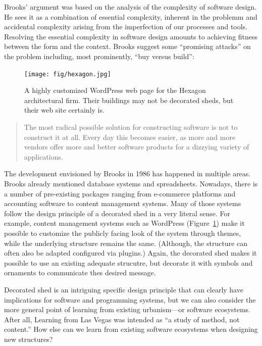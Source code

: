 Brooks' argument was based on the analysis of the complexity of software design. He sees it as a
combination of essential complexity, inherent in the problemm and accidental complexity arising
from the imperfection of our processes and tools. Resolving the essential complexity in software
design amounts to achieving fitness between the form and the context. Brooks suggest
some ``promising attacks'' on the problem including, most prominently, ``buy versus build'':

\begin{figure}
  \centering
  \texttt{[image: fig/hexagon.jpg]}
  \caption{A highly customized WordPress web page for the Hexagon architectural firm. Their
  buildings may not be decorated sheds, but their web site certainly is.}
  \label{fig:wordpress}
\end{figure}

\begin{quote}
The most radical possible solution for constructing software is not to construct it at all.
Every day this becomes easier, as more and more vendors offer more and better software products
for a dizzying variety of applications.
\end{quote}

The development envisioned by Brooks in 1986 has happened in multiple areas. Brooks already
mentioned database systems and spreadsheets. Nowadays, there is a number of pre-existing packages
ranging from e-commerce platforms and accounting software to content management systems.
Many of those systems follow the design principle of a decorated shed in a very literal sense.
For example, content management systems such as WordPress (Figure~\ref{fig:wordpress}) make it
possible to customize the publicly facing look of the system through themes, while the underlying
structure remains the same. (Although, the structure can often also be adapted configured via
plugins.) Again, the decorated shed makes it possible to use an existing adequate strucutre,
but decorate it with symbols and ornaments to communicate thes desired message.


Decorated shed is an intriguing specific design principle that can clearly have implications
for software and programming systems, but we can also consider the more general point
of learning from existing urbanism---or software ecosystems. After all, Learning from Las Vegas
was intended as ``a study of method, not content.'' How else can we learn
from existing software ecosystems when designing new structures?


